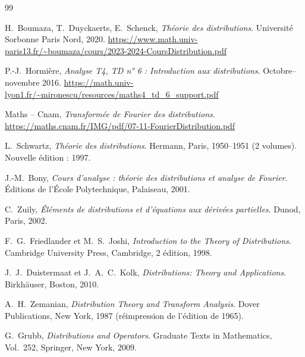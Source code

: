 \documentclass[12pt,a4paper,openany]{book}
\theoremstyle{definition}
\theoremstyle{plain}
\theoremstyle{remark}
\begin{document}
\begin{thebibliography}{99}

H.~Boumaza, T.~Duyckaerts, E.~Schenck, \textit{Théorie des distributions}. 
Université Sorbonne Paris Nord, 2020. 
\url{https://www.math.univ-paris13.fr/~boumaza/cours/2023-2024-CoursDistribution.pdf}

P.-J.~Hormière, \textit{Analyse T4, TD n° 6 : Introduction aux distributions}. 
Octobre--novembre 2016. 
\url{https://math.univ-lyon1.fr/~mironescu/resources/maths4_td_6_support.pdf}

Maths -- Cnam, \textit{Transformée de Fourier des distributions}.
\url{https://maths.cnam.fr/IMG/pdf/07-11-FourierDistribution.pdf}

L.~Schwartz, \textit{Théorie des distributions}.
Hermann, Paris, 1950--1951 (2 volumes). Nouvelle édition : 1997.

J.-M.~Bony, \textit{Cours d'analyse : théorie des distributions et analyse de Fourier}.
Éditions de l'École Polytechnique, Palaiseau, 2001.

C.~Zuily, \textit{Éléments de distributions et d'équations aux dérivées partielles}.
Dunod, Paris, 2002.



F.~G.~Friedlander et M.~S.~Joshi, \textit{Introduction to the Theory of Distributions}.
Cambridge University Press, Cambridge, 2 édition, 1998.

J.~J.~Duistermaat et J.~A.~C.~Kolk, \textit{Distributions: Theory and Applications}.
Birkhäuser, Boston, 2010.



A.~H.~Zemanian, \textit{Distribution Theory and Transform Analysis}.
Dover Publications, New York, 1987 (réimpression de l'édition de 1965).


G.~Grubb, \textit{Distributions and Operators}.
Graduate Texts in Mathematics, Vol.~252, Springer, New York, 2009.


\end{thebibliography}
\end{document}
